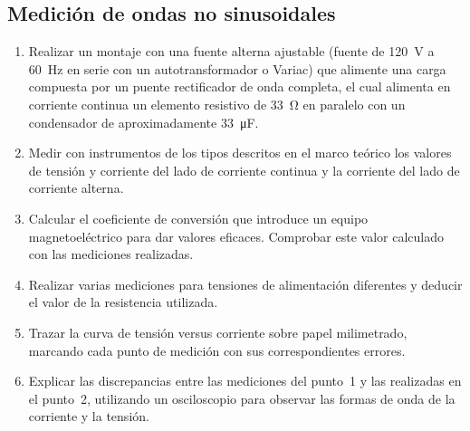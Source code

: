 \subsection{Medición de ondas no sinusoidales}
\begin{enumerate}
    \item Realizar un montaje con una fuente alterna ajustable (fuente de \SI{120}{V} a \SI{60}{Hz} en serie con un autotransformador o Variac) que alimente una carga compuesta por un puente rectificador de onda completa, el cual alimenta en corriente continua un elemento resistivo de \SI{33}{\ohm} en paralelo con un condensador de aproximadamente \SI{33}{\micro\farad}.
    \item Medir con instrumentos de los tipos descritos en el marco teórico los valores de tensión y corriente del lado de corriente continua y la corriente del lado de corriente alterna.
    \item Calcular el coeficiente de conversión que introduce un equipo magnetoeléctrico para dar valores eficaces. Comprobar este valor calculado con las mediciones realizadas.
    \item Realizar varias mediciones para tensiones de alimentación diferentes y deducir el valor de la resistencia utilizada.
    \item Trazar la curva de tensión versus corriente sobre papel milimetrado, marcando cada punto de medición con sus correspondientes errores.
    \item Explicar las discrepancias entre las mediciones del punto~1 y las realizadas en el punto~2, utilizando un osciloscopio para observar las formas de onda de la corriente y la tensión.
\end{enumerate}
